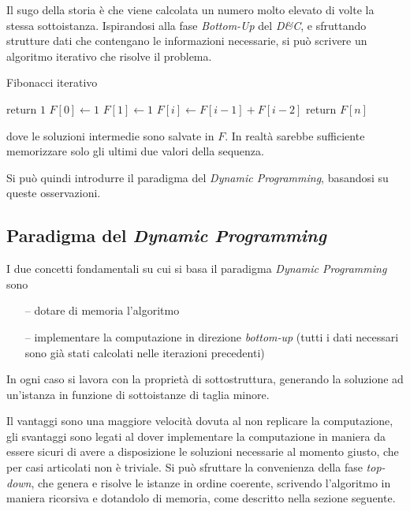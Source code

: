Il sugo della storia è che viene calcolata un numero molto elevato di volte la stessa sottoistanza. Ispirandosi alla fase \emph{Bottom-Up} del \emph{D\&C}, e sfruttando strutture dati che contengano le informazioni necessarie, si può scrivere un algoritmo iterativo che risolve il problema.
\begin{algorithm}[H]
\caption{Fibonacci iterativo}\label{alg:itfib}
\begin{algorithmic}[1]
            \State return $1$
        \EndIf
        \State $F[0] \gets 1$
        \State $F[1] \gets 1$
            \State $F[i] \gets F[i-1] + F[i-2]$
        \EndFor
        \State return $F[n]$
    \EndProcedure
\end{algorithmic}
\end{algorithm}
\noindent
dove le soluzioni intermedie sono salvate in $F$. In realtà sarebbe sufficiente memorizzare solo gli ultimi due valori della sequenza.

Si può quindi introdurre il paradigma del \emph{Dynamic Programming}, basandosi su queste osservazioni.

\subsection{Paradigma del \emph{Dynamic Programming}}
I due concetti fondamentali su cui si basa il paradigma \emph{Dynamic Programming} sono
\begin{itemize}[noitemsep,topsep=0pt,parsep=0pt,partopsep=0pt]
    \item[--] dotare di memoria l'algoritmo
    \item[--] implementare la computazione in direzione \emph{bottom-up} (tutti i dati necessari sono già stati calcolati nelle iterazioni precedenti)
\end{itemize}
In ogni caso si lavora con la proprietà di sottostruttura, generando la soluzione ad un'istanza in funzione di sottoistanze di taglia minore.

Il vantaggi sono una maggiore velocità dovuta al non replicare la computazione, gli svantaggi sono legati al dover implementare la computazione in maniera da essere sicuri di avere a disposizione le soluzioni necessarie al momento giusto, che per casi articolati non è triviale. Si può sfruttare la convenienza della fase \emph{top-down}, che genera e risolve le istanze in ordine coerente, scrivendo l'algoritmo in maniera ricorsiva e dotandolo di memoria, come descritto nella sezione seguente.


